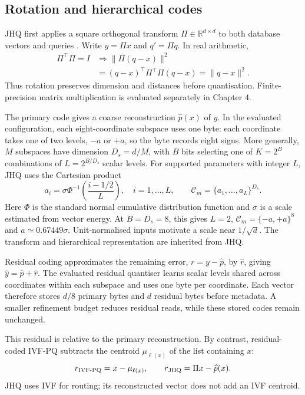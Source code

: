 \subsection{Rotation and hierarchical codes}

JHQ first applies a square orthogonal transform
$\Pi\in\mathbb R^{d\times d}$ to both database vectors and queries
\cite{jhq}. Write $y=\Pi x$ and $q'=\Pi q$. In real arithmetic,
\begin{equation}
 \begin{aligned}
 \Pi^\top\Pi=I
 &\Longrightarrow
 \|\Pi(q-x)\|^2\\
 &=(q-x)^\top\Pi^\top\Pi(q-x)=\|q-x\|^2.
 \end{aligned}
 \label{eq:2-isometry}
\end{equation}
Thus rotation preserves dimension and distances before quantisation.
Finite-precision matrix multiplication is evaluated separately in Chapter 4.

The primary code gives a coarse reconstruction $\widehat p(x)$ of $y$.
In the evaluated configuration, each eight-coordinate subspace uses one
byte: each coordinate takes one of two levels, $-a$ or $+a$, so the byte
records eight signs. More generally, $M$ subspaces have dimension
$D_s=d/M$, with $B$ bits selecting one of $K=2^B$ combinations of
$L=2^{B/D_s}$ scalar levels. For supported parameters with integer $L$,
JHQ uses the Cartesian product
\begin{equation}
 a_i=\sigma\Phi^{-1}\!\left(\frac{i-1/2}{L}\right),\quad
 i=1,\ldots,L,\qquad
 \mathcal C_m=\{a_1,\ldots,a_L\}^{D_s}.
 \label{eq:2-cartesian}
\end{equation}
Here $\Phi$ is the standard normal cumulative distribution function and
$\sigma$ is a scale estimated from vector energy. At $B=D_s=8$, this
gives $L=2$, $\mathcal C_m=\{-a,+a\}^8$ and
$a\simeq0.67449\sigma$. Unit-normalised inputs motivate a scale near
$1/\sqrt d$. The transform and hierarchical representation are inherited
from JHQ.

Residual coding approximates the remaining error,
$r=y-\widehat p$, by $\widehat r$, giving
$\widehat y=\widehat p+\widehat r$. The evaluated residual quantiser learns
scalar levels shared across coordinates within each subspace and uses one
byte per coordinate. Each vector therefore stores $d/8$ primary bytes
and $d$ residual bytes before metadata. A smaller refinement budget reduces
residual reads, while these stored codes remain unchanged.

This residual is relative to the primary reconstruction. By contrast,
residual-coded IVF-PQ subtracts the centroid $\mu_{\ell(x)}$ of the list
containing $x$:
\[
 r_{\rm IVF\text{-}PQ}=x-\mu_{\ell(x)},\qquad
 r_{\rm JHQ}=\Pi x-\widehat p(x).
\]
JHQ uses IVF for routing; its reconstructed vector does not add an IVF centroid.

